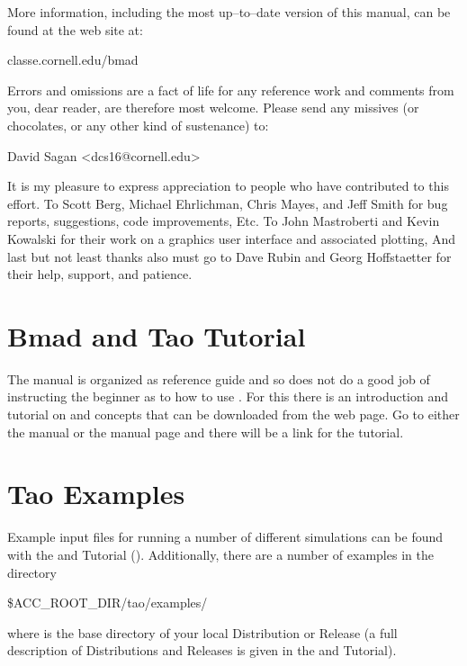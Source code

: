 More information, including the most up--to--date version of this manual, can be found at the \bmad
web site at:
\begin{example}
  classe.cornell.edu/bmad
\end{example}

Errors and omissions are a fact of life for any reference work and comments from you, dear reader,
are therefore most welcome. Please send any missives (or chocolates, or any other kind of
sustenance) to:
\begin{example}
  David Sagan <dcs16@cornell.edu>
\end{example}

It is my pleasure to express appreciation to people who have contributed to this effort. To Scott
Berg, Michael Ehrlichman, Chris Mayes, and Jeff Smith for bug reports, suggestions, code
improvements, Etc. To John Mastroberti and Kevin Kowalski for their work on a graphics user
interface and associated plotting, And last but not least thanks also must go to Dave Rubin and
Georg Hoffstaetter for their help, support, and patience.

\section{Bmad and Tao Tutorial}
\label{s:tutorial}

\vspace{0.1in} The \tao manual is organized as reference guide and so does not do a good job of
instructing the beginner as to how to use \tao. For this there is an introduction and tutorial on
\bmad and \tao concepts that can be downloaded from the \bmad web page. Go to either the \bmad
manual or the \tao manual page and there will be a link for the tutorial.

\section{Tao Examples}
\label{s:examples}

Example input files for running a number of different simulations can be found with the \bmad and \tao
Tutorial (). Additionally, there are a number of examples in the directory
\begin{example}
  \$ACC_ROOT_DIR/tao/examples/
\end{example}
where  is the base directory of your local \bmad Distribution or Release (a full
description of \bmad Distributions and Releases is given in the \bmad and \tao Tutorial).

